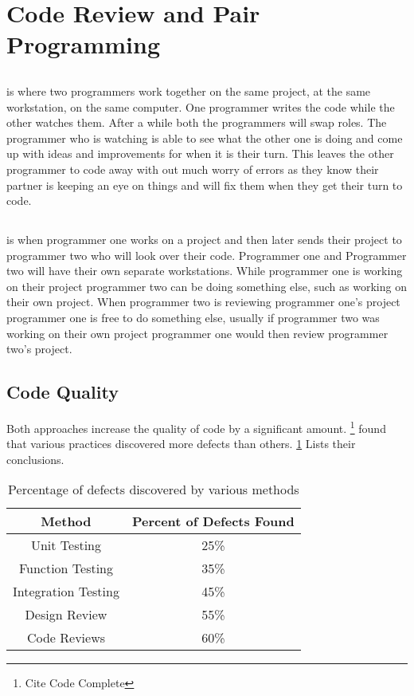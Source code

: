 \documentclass{article}
\begin{document}
\section{Code Review and Pair Programming}

\subsection{\PP}
\PP is where two programmers work together on the same project, at the same workstation, on the same computer. One programmer writes the code while the other watches them. After a while both the programmers will swap roles. The programmer who is watching is able to see what the other one is doing and come up with ideas and improvements for when it is their turn. This leaves the other programmer to code away with out much worry of errors as they know their partner is keeping an eye on things and will fix them when they get their turn to code.

\subsection{\CR}
\CR is when programmer one works on a project and then later sends their project to programmer two who will look over their code. Programmer one and Programmer two will have their own separate workstations. While programmer one is working on their project programmer two can be doing something else, such as working on their own project. When programmer two is reviewing programmer one's project programmer one is free to do something else, usually if programmer two was working on their own project programmer one would then review programmer two's project. 

\subsection{Code Quality}

Both approaches increase the quality of code by a significant amount. \footnote{Cite Code Complete} found that various practices discovered more defects than others. \ref{tab:defect} Lists their conclusions.

\begin{table}[hb]
\begin{tabular}{c|c}
Method & Percent of Defects Found\\\hline
Unit Testing & 25\% \\
Function Testing & 35\% \\
Integration Testing & 45\% \\
Design Review & 55\% \\
Code Reviews & 60\%\\
\end{tabular}
\label{tab:defect}
\caption{Percentage of defects discovered by various methods}
\end{table}
\end{document}
